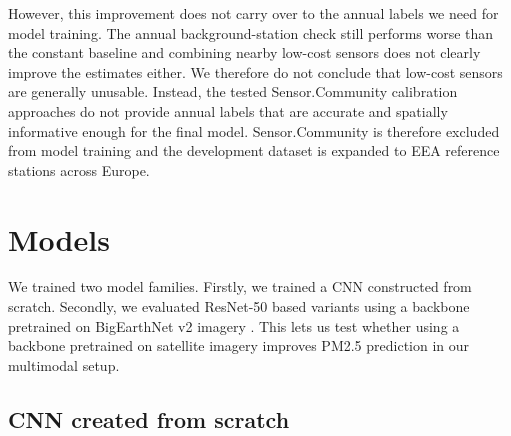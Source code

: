 \documentclass[english, a4paper]{article}
\begin{document}
However, this improvement does not carry over to the annual labels we need for model training. The annual background-station check still performs worse than the constant baseline and combining nearby low-cost sensors does not clearly improve the estimates either. We therefore do not conclude that low-cost sensors are generally unusable. Instead, the tested Sensor.Community calibration approaches do not provide annual labels that are accurate and spatially informative enough for the final model. Sensor.Community is therefore excluded from model training and the development dataset is expanded to EEA reference stations across Europe.

\section{Models}
We trained two model families. Firstly, we trained a CNN constructed from scratch. Secondly, we evaluated ResNet-50 based variants using a backbone pretrained on BigEarthNet v2 imagery \citep{he2015deepresiduallearningimage,clasen2025refinedbigearthnet}. This lets us test whether using a backbone pretrained on satellite imagery improves PM2.5 prediction in our multimodal setup.

\subsection{CNN created from scratch}
\label{sec:cnn_scratch}
\end{document}
